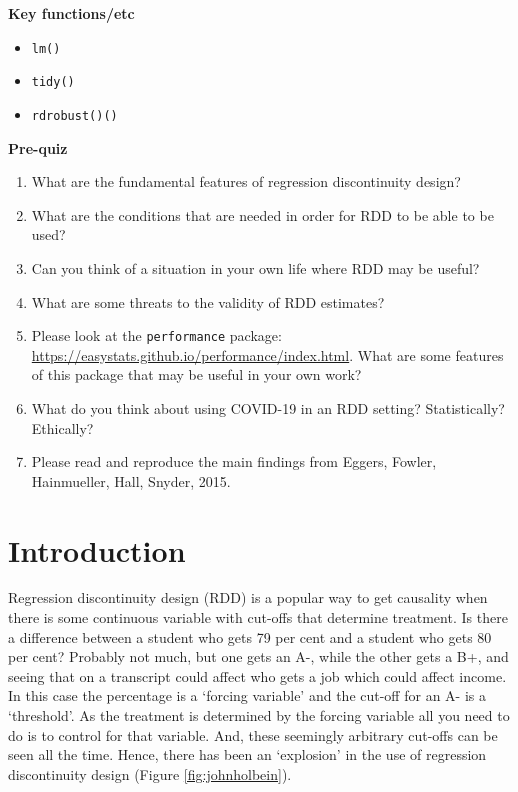 \documentclass[
]{book}
\providecommand{\tightlist}{%
  \setlength{\itemsep}{0pt}\setlength{\parskip}{0pt}}
\begin{document}
\textbf{Key functions/etc}

\begin{itemize}
\tightlist
\item
  \texttt{lm()}
\item
  \texttt{tidy()}
\item
  \texttt{rdrobust()()}
\end{itemize}

\textbf{Pre-quiz}

\begin{enumerate}
\def\labelenumi{\arabic{enumi}.}
\tightlist
\item
  What are the fundamental features of regression discontinuity design?
\item
  What are the conditions that are needed in order for RDD to be able to be used?
\item
  Can you think of a situation in your own life where RDD may be useful?
\item
  What are some threats to the validity of RDD estimates?
\item
  Please look at the \texttt{performance} package: \url{https://easystats.github.io/performance/index.html}. What are some features of this package that may be useful in your own work?
\item
  What do you think about using COVID-19 in an RDD setting? Statistically? Ethically?
\item
  Please read and reproduce the main findings from Eggers, Fowler, Hainmueller, Hall, Snyder, 2015.
\end{enumerate}

\hypertarget{introduction-23}{%
\section{Introduction}\label{introduction-23}}

Regression discontinuity design (RDD) is a popular way to get causality when there is some continuous variable with cut-offs that determine treatment. Is there a difference between a student who gets 79 per cent and a student who gets 80 per cent? Probably not much, but one gets an A-, while the other gets a B+, and seeing that on a transcript could affect who gets a job which could affect income. In this case the percentage is a `forcing variable' and the cut-off for an A- is a `threshold'. As the treatment is determined by the forcing variable all you need to do is to control for that variable. And, these seemingly arbitrary cut-offs can be seen all the time. Hence, there has been an `explosion' in the use of regression discontinuity design (Figure \ref{fig:johnholbein}).
\end{document}
